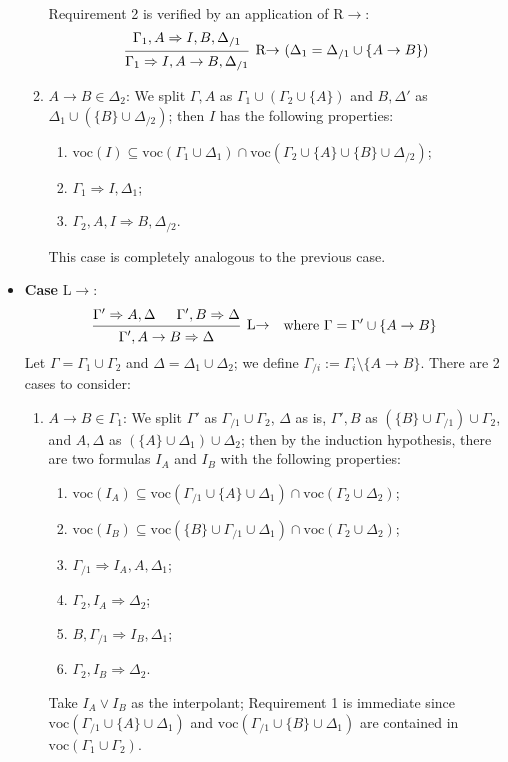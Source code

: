 \documentclass[a4paper]{article}
\newcommand{\voc}{\mathrm{voc}}
\begin{document}
\begin{itemize}
\begin{enumerate}
    Requirement 2 is verified by an application of R$\to$:
    \[
      \begin{prooftree}
        \hypo{\Gamma_1,A \Rightarrow I, B, \Delta_{/1}}
        \infer1[R$\to$ ($\Delta_1 = \Delta_{/1} \cup \{A \to B\}$)]{\Gamma_1 \Rightarrow I, A \to B, \Delta_{/1}}
      \end{prooftree}
    \]
  \item $A \to B \in \Delta_2$: We split $\Gamma,A$ as $\Gamma_1 \cup (\Gamma_2 \cup \{A\})$ and $B,\Delta'$ as $\Delta_1 \cup (\{B\} \cup \Delta_{/2})$; then $I$ has the following properties:
    \begin{enumerate}
    \item $\voc(I) \subseteq \voc(\Gamma_1 \cup \Delta_1) \cap \voc(\Gamma_2 \cup \{A\} \cup \{B\} \cup \Delta_{/2})$;
    \item $\Gamma_1 \Rightarrow I, \Delta_1$;
    \item $\Gamma_2,A,I \Rightarrow B,\Delta_{/2}$.
    \end{enumerate}
    This case is completely analogous to the previous case.
  \end{enumerate}
\item \textbf{Case} L$\to$:
  \begin{align*}
    \begin{prooftree}
      \hypo{\Gamma' \Rightarrow A, \Delta}
      \hypo{\Gamma', B \Rightarrow \Delta}
      \infer2[L$\to$]{\Gamma', A \to B \Rightarrow \Delta}
    \end{prooftree}
    && \text{where $\Gamma = \Gamma' \cup \{A \to B\}$}
  \end{align*}
  Let $\Gamma = \Gamma_1 \cup \Gamma_2$ and $\Delta = \Delta_1 \cup \Delta_2$; we define $\Gamma_{/i} := \Gamma_i \setminus \{A \to B\}$.
  There are 2 cases to consider:
  \begin{enumerate}
  \item $A \to B \in \Gamma_1$: We split $\Gamma'$ as $\Gamma_{/1} \cup \Gamma_2$, $\Delta$ as is, $\Gamma',B$ as $(\{B\} \cup \Gamma_{/1}) \cup \Gamma_2$, and $A, \Delta$ as $(\{A\} \cup \Delta_1) \cup \Delta_2$; then by the induction hypothesis, there are two formulas $I_A$ and $I_B$ with the following properties:
    \begin{enumerate}
    \item $\voc(I_A) \subseteq \voc(\Gamma_{/1} \cup \{A\} \cup \Delta_1) \cap \voc(\Gamma_2 \cup \Delta_2)$;
    \item $\voc(I_B) \subseteq \voc(\{B\} \cup \Gamma_{/1} \cup \Delta_1) \cap \voc(\Gamma_2 \cup \Delta_2)$;
    \item $\Gamma_{/1} \Rightarrow I_A, A, \Delta_1$;
    \item $\Gamma_2, I_A \Rightarrow \Delta_2$;
    \item $B, \Gamma_{/1} \Rightarrow I_B, \Delta_1$;
    \item $\Gamma_2, I_B \Rightarrow \Delta_2$.
    \end{enumerate}
    Take $I_A \vee I_B$ as the interpolant; Requirement 1 is immediate since $\voc(\Gamma_{/1} \cup \{A\} \cup \Delta_1)$ and $\voc(\Gamma_{/1} \cup \{B\} \cup \Delta_1)$ are contained in $\voc(\Gamma_1 \cup \Gamma_2)$.


\end{enumerate}
\end{itemize}
\end{document}
